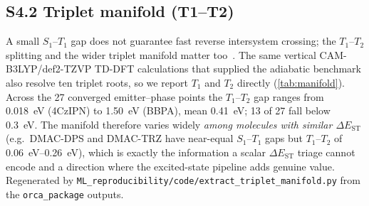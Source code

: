 \documentclass[twoside,twocolumn,9pt]{extarticle}
\begin{document}
\subsection*{S4.2 Triplet manifold (T1--T2)}\label{sec:triplet_manifold}
A small $S_1$--$T_1$ gap does not guarantee fast reverse intersystem crossing; the
$T_1$--$T_2$ splitting and the wider triplet manifold matter too~\cite{Keruckiene2024}.
The same vertical CAM-B3LYP/def2-TZVP TD-DFT calculations that supplied the adiabatic
benchmark also resolve ten triplet roots, so we report $T_1$ and $T_2$ directly
(\cref{tab:manifold}). Across the \num{27} converged emitter--phase points the $T_1$--$T_2$
gap ranges from \qty{0.018}{\electronvolt} (4CzIPN) to \qty{1.50}{\electronvolt} (BBPA),
mean \qty{0.41}{\electronvolt}; \num{13} of \num{27} fall below \qty{0.3}{\electronvolt}.
The manifold therefore varies widely \emph{among molecules with similar $\Delta E_\text{ST}$}
(e.g.\ DMAC-DPS and DMAC-TRZ have near-equal $S_1$--$T_1$ gaps but $T_1$--$T_2$ of
\qtyrange{0.06}{0.26}{\electronvolt}), which is exactly the information a scalar
$\Delta E_\text{ST}$ triage cannot encode and a direction where the excited-state pipeline
adds genuine value. Regenerated by \texttt{ML\_reproducibility/code/extract\_triplet\_manifold.py} from the
\texttt{orca\_package} outputs.
\end{document}
